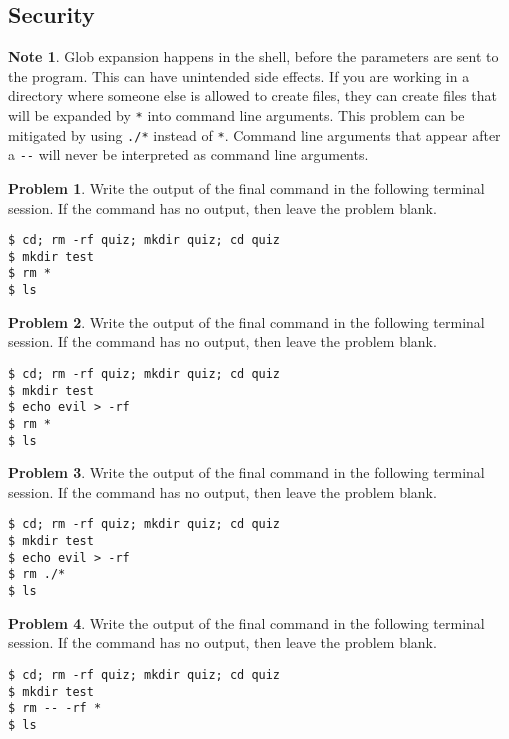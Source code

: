 \documentclass[10pt]{article}
\theoremstyle{definition}
\newtheorem{problem}{Problem}
\newtheorem{note}{Note}
\begin{document}
\filbreak
\subsection{Security}

\begin{note}
    Glob expansion happens in the shell,
    before the parameters are sent to the program.
    This can have unintended side effects.
    If you are working in a directory where someone else is allowed to create files,
    they can create files that will be expanded by \lstinline{*} into command line arguments.
    This problem can be mitigated by using \lstinline{./*} instead of \lstinline{*}.
    Command line arguments that appear after a \lstinline{--} will never be interpreted as command line arguments.
\end{note}

\begin{problem}
    Write the output of the final command in the following terminal session.
    If the command has no output, then leave the problem blank.
\end{problem}
\begin{lstlisting}
$ cd; rm -rf quiz; mkdir quiz; cd quiz
$ mkdir test
$ rm *
$ ls
\end{lstlisting}


\filbreak
\begin{problem}
    Write the output of the final command in the following terminal session.
    If the command has no output, then leave the problem blank.
\end{problem}
\begin{lstlisting}
$ cd; rm -rf quiz; mkdir quiz; cd quiz
$ mkdir test
$ echo evil > -rf
$ rm *
$ ls
\end{lstlisting}


\filbreak
\begin{problem}
    Write the output of the final command in the following terminal session.
    If the command has no output, then leave the problem blank.
\end{problem}
\begin{lstlisting}
$ cd; rm -rf quiz; mkdir quiz; cd quiz
$ mkdir test
$ echo evil > -rf
$ rm ./*
$ ls
\end{lstlisting}


\filbreak
\begin{problem}
    Write the output of the final command in the following terminal session.
    If the command has no output, then leave the problem blank.
\end{problem}
\begin{lstlisting}
$ cd; rm -rf quiz; mkdir quiz; cd quiz
$ mkdir test
$ rm -- -rf *
$ ls
\end{lstlisting}
\end{document}
